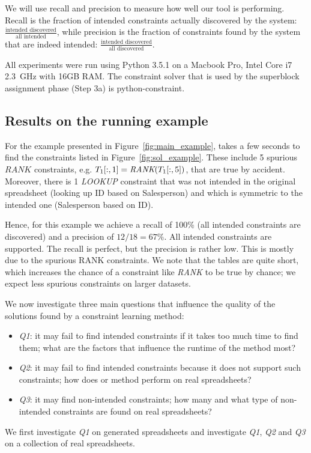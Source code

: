 We will use recall and precision to measure how well our tool is performing. Recall is the fraction of intended constraints actually discovered by the system: $\frac{\text{intended discovered}}{\text{all intended}}$, while precision is the fraction of constraints found by the system that are indeed intended: $\frac{\text{intended discovered}}{\text{all discovered}}$.

All experiments were run using Python 3.5.1 on a Macbook Pro, Intel Core i7 2.3~GHz with 16GB RAM.
The constraint solver that is used by the superblock assignment phase (Step 3a) is python-constraint\cite{python_constraint}.



\subsection{Results on the running example}
For the example presented in Figure~\ref{fig:main_example},
\sname takes a few seconds to find the constraints listed in Figure~\ref{fig:sol_example}.
These include 5 spurious $\textit{RANK}$ constraints, e.g. $T_1[:,1] = \textit{RANK}(T_1[:,5])$, that are true by accident.
Moreover, there is 1 \textit{LOOKUP} constraint that was not intended in the original spreadsheet (looking up ID based on Salesperson) and which is symmetric to the intended one (Salesperson based on ID).

Hence, for this example we achieve a recall of 100\% (all intended constraints are discovered) and a precision of $12/18 = 67\%$. All intended constraints are supported. The recall is perfect, but the precision is rather low. This is mostly due to the spurious RANK constraints. We note that the tables are quite short, which increases the chance of a constraint like \textit{RANK} to be true by chance; we expect less spurious constraints on larger datasets.

We now investigate three main questions that influence the quality of the solutions found by a constraint learning method:
\begin{itemize}
\item \textit{Q1}: it may fail to find intended constraints if it takes too much time to find them; what are the factors that influence the runtime of the method most?
\item \textit{Q2}: it may fail to find intended constraints because it does not support such constraints; how does or method perform on real spreadsheets?
\item \textit{Q3}: it may find non-intended constraints; how many and what type of non-intended constraints are found on real spreadsheets?
\end{itemize}
We first investigate \textit{Q1} on generated spreadsheets and investigate \textit{Q1}, \textit{Q2} and \textit{Q3} on a collection of real spreadsheets.


